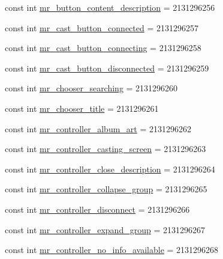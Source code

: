 \begin{CompactItemize}
\item 
const int \hyperlink{class__2doo_1_1_droid_1_1_resource_1_1_string_8baac646b569af1a40406cd468536fbd}{mr\_\-button\_\-content\_\-description} = 2131296256
\item 
const int \hyperlink{class__2doo_1_1_droid_1_1_resource_1_1_string_ec89730159c74ed6a6e6782535a8bdbf}{mr\_\-cast\_\-button\_\-connected} = 2131296257
\item 
const int \hyperlink{class__2doo_1_1_droid_1_1_resource_1_1_string_f89090459007e0da1115f4fce1f7c160}{mr\_\-cast\_\-button\_\-connecting} = 2131296258
\item 
const int \hyperlink{class__2doo_1_1_droid_1_1_resource_1_1_string_7caf03d52ca3a4ab732426e2eb58d03b}{mr\_\-cast\_\-button\_\-disconnected} = 2131296259
\item 
const int \hyperlink{class__2doo_1_1_droid_1_1_resource_1_1_string_4de51dc2e544afbb35041c45d8573bda}{mr\_\-chooser\_\-searching} = 2131296260
\item 
const int \hyperlink{class__2doo_1_1_droid_1_1_resource_1_1_string_5432bb85813a050c2f57be7056ce096a}{mr\_\-chooser\_\-title} = 2131296261
\item 
const int \hyperlink{class__2doo_1_1_droid_1_1_resource_1_1_string_24c6b3871803c465223eaacdb4e25f33}{mr\_\-controller\_\-album\_\-art} = 2131296262
\item 
const int \hyperlink{class__2doo_1_1_droid_1_1_resource_1_1_string_02b11f76a8f2f4f0837189c92a5c3238}{mr\_\-controller\_\-casting\_\-screen} = 2131296263
\item 
const int \hyperlink{class__2doo_1_1_droid_1_1_resource_1_1_string_e7ed97a751dd117aa4cb1653f1b5fae4}{mr\_\-controller\_\-close\_\-description} = 2131296264
\item 
const int \hyperlink{class__2doo_1_1_droid_1_1_resource_1_1_string_f66c9b11f4ff687c17e9eff73a86c072}{mr\_\-controller\_\-collapse\_\-group} = 2131296265
\item 
const int \hyperlink{class__2doo_1_1_droid_1_1_resource_1_1_string_ab60f05de7555c996c4c6c58e6c96ee6}{mr\_\-controller\_\-disconnect} = 2131296266
\item 
const int \hyperlink{class__2doo_1_1_droid_1_1_resource_1_1_string_351d77cf30bb97621db54f6db8b2eeaa}{mr\_\-controller\_\-expand\_\-group} = 2131296267
\item 
const int \hyperlink{class__2doo_1_1_droid_1_1_resource_1_1_string_8b5eb79e589d0134fb744a786a520c08}{mr\_\-controller\_\-no\_\-info\_\-available} = 2131296268
\item 

\end{CompactItemize}
